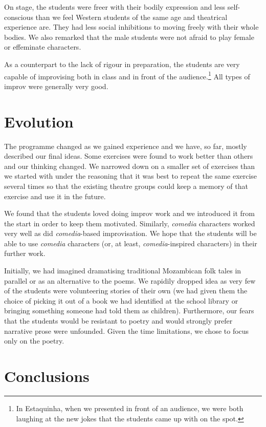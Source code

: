 \documentclass[article,twocolumn,twoside]{memoir}
\begin{document}
On stage, the students were freer with their bodily expression and less
self-conscious than we feel Western students of the same age and theatrical
experience are. They had less social inhibitions to moving freely with their
whole bodies. We also remarked that the male students were not afraid to play
female or effeminate characters.

As a counterpart to the lack of rigour in preparation, the students are
very capable of improvising both in class and in front of the
audience.\footnote{In Estaquinha, when we presented in front of an audience, we
were both laughing at the new jokes that the students came up with on the
spot.} All types of improv were generally very good.

\chapter{Evolution}

The programme changed as we gained experience and we have, so far, mostly
described our final ideas. Some exercises were found to work better than others
and our thinking changed. We narrowed down on a smaller set of exercises than
we started with under the reasoning that it was best to repeat the same
exercise several times so that the existing theatre groups could keep a memory
of that exercise and use it in the future.

We found that the students loved doing improv work and we introduced it from
the start in order to keep them motivated. Similarly, \textit{comedia}
characters worked very well as did \textit{comedia}-based improvisation. We
hope that the students will be able to use \textit{comedia} characters (or, at
least, \textit{comedia}-inspired characters) in their further work.

Initially, we had imagined dramatising traditional Mozambican folk tales in
parallel or as an alternative to the poems. We rapidily dropped idea as very
few of the students were volunteering stories of their own (we had given them
the choice of picking it out of a book we had identified at the school library
or bringing something someone had told them as children). Furthermore, our
fears that the students would be resistant to poetry and would strongly prefer
narrative prose were unfounded. Given the time limitations, we chose to focus
only on the poetry.

\chapter{Conclusions}
\end{document}
